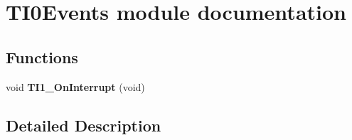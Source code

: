 \hypertarget{group___t_i0_events__module}{}\section{T\+I0\+Events module documentation}
\label{group___t_i0_events__module}
\subsection*{Functions}
\begin{DoxyCompactItemize}
\item 
\mbox{\label{group___t_i0_events__module_ga01b566cf25a21b34152513dcb1321a11}} 
void {\bfseries T\+I1\+\_\+\+On\+Interrupt} (void)
\end{DoxyCompactItemize}


\subsection{Detailed Description}
